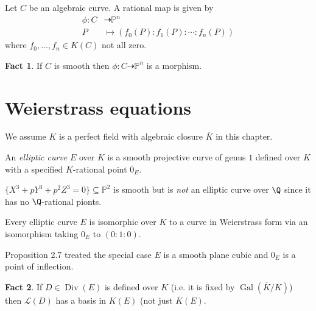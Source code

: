 \documentclass[a4paper]{article}
\theoremstyle{definition}
\newtheorem*{fact}{Fact}
\renewcommand*{\P}{\mathbb{P}}
\DeclareMathOperator{\Div}{Div} %
\newcommand{\rational}{\dashrightarrow} %
\begin{document}
\begin{remark}
  Let \(C\) be an algebraic curve. A rational map is given by
  \begin{align*}
    \phi: C &\rational \P^n \\
    P &\mapsto (f_0(P) : f_1(P) : \cdots : f_n(P))
  \end{align*}
  where \(f_0, \dots, f_n \in K(C)\) not all zero.
\end{remark}

\begin{fact}
  If \(C\) is smooth then \(\phi: C \rational \P^n\) is a morphism.
\end{fact}

\section{Weierstrass equations}

We assume \(K\) is a perfect field with algebraic closure \(\overline K\) in this chapter.

\begin{definition}
  An \emph{elliptic curve} \(E\) over \(K\) is a smooth projective curve of genus \(1\) defined over \(K\) with a specified \(K\)-rational point \(0_E\).
\end{definition}

\begin{eg}
  \(\{X^3 + pY^3 + p^2Z^3 = 0\} \subseteq \P^2\) is smooth but is \emph{not} an elliptic curve over \(\Q\) since it has no \(\Q\)-rational pionts.
\end{eg}

\begin{theorem}
  Every elliptic curve \(E\) is isomorphic over \(K\) to a curve in Weierstrass form via an isomorphism taking \(0_E\) to \((0 : 1 : 0)\).
\end{theorem}

\begin{remark}
  Proposition 2.7 treated the special case \(E\) is a smooth plane cubic and \(0_E\) is a point of inflection.
\end{remark}

\begin{fact}
  If \(D \in \Div(E)\) is defined over \(K\) (i.e. it is fixed by \(\operatorname{Gal}(\overline K/K)\)) then \(\mathcal L(D)\) has a basis in \(K(E)\) (not just \(\overline K(E)\).
\end{fact}
\end{document}
